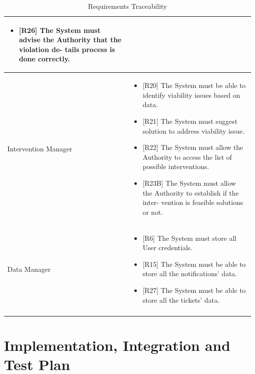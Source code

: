 \documentclass{article}
\begin{document}
\begin{longtable}{| p{5 cm} | p{8 cm} |}
\begin{itemize}
{about the violation.}
			\item  {[R26] The System must advise the Authority that the violation de- tails process is done correctly.}
		\end{itemize}		\\	 \hline	
			\newline Intervention Manager & 
		\begin{itemize}
			\item  {[R20] The System must be able to identify viability issues based on data.}
			\item  {[R21] The System must suggest solution to address viability issue.}
			\item  {[R22] The System must allow the Authority to access the list of possible interventions.
}
			\item  {[R23B] The System must allow the Authority to establish if the inter- vention is feasible solutions or not.}
		\end{itemize}		\\	 \hline	
			\newline Data Manager & 
		\begin{itemize}
			\item {[R6] The System must store all User credentials.}

			\item  {[R15] The System must be able to store all the notifications’ data.}
			\item   {[R27] The System must be able to store all the tickets’ data.}
		\end{itemize}		\\	 \hline			
		\caption{Requirements Traceability}	
		
	\end{longtable}
	
	\pagebreak
	
	
\section{Implementation, Integration and Test Plan}
\end{document}
